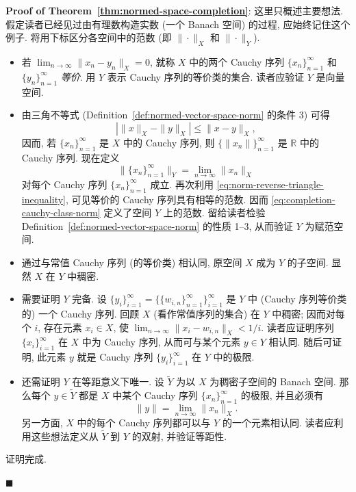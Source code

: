 \begingroup
\renewenvironment{Proof}{\vspace{0.1cm}\par}
{\par\hfill$\blacksquare$\par\vspace{0.1cm}}
\begin{Proof}
\textbf{Proof of Theorem~\ref{thm:normed-space-completion}}: 这里只概述主要想法. 假定读者已经见过由有理数构造实数 (一个 Banach 空间) 的过程, 应始终记住这个例子. 将用下标区分各空间中的范数 (即 $\|\cdot\|_X$ 和 $\|\cdot\|_Y$).\begin{itemize}\item 若 $\lim_{n\to\infty}\|x_n-y_n\|_X=0$, 就称 $X$ 中的两个 Cauchy 序列 $\{x_n\}_{n=1}^\infty$ 和 $\{y_n\}_{n=1}^\infty$ \emph{等价}. 用 $Y$ 表示 Cauchy 序列的等价类的集合. 读者应验证 $Y$ 是向量空间.
\item 由三角不等式 (Definition~\ref{def:normed-vector-space-norm} 的条件 3) 可得
\begin{equation}\label{eq:norm-reverse-triangle-inequality}
|\|x\|_X-\|y\|_X|\leq\|x-y\|_X,
\end{equation}
因而, 若 $\{x_n\}_{n=1}^\infty$ 是 $X$ 中的 Cauchy 序列, 则 $\{\|x_n\|\}_{n=1}^\infty$ 是 $\mathbb{R}$ 中的 Cauchy 序列. 现在定义
\begin{equation}\label{eq:completion-cauchy-class-norm}
\|\{x_n\}_{n=1}^\infty\|_Y=\lim_{n\to\infty}\|x_n\|_X
\end{equation}
对每个 Cauchy 序列 $\{x_n\}_{n=1}^\infty$ 成立. 再次利用 \eqref{eq:norm-reverse-triangle-inequality}, 可见等价的 Cauchy 序列具有相等的范数. 因而 \eqref{eq:completion-cauchy-class-norm} 定义了空间 $Y$ 上的范数. 留给读者检验 Definition~\ref{def:normed-vector-space-norm} 的性质 1--3, 从而验证 $Y$ 为赋范空间.
\item 通过与常值 Cauchy 序列 (的等价类) 相认同, 原空间 $X$ 成为 $Y$ 的子空间. 显然 $X$ 在 $Y$ 中稠密.
\item 需要证明 $Y$ 完备. 设 $\{y_i\}_{i=1}^\infty=\{\{w_{i,n}\}_{n=1}^\infty\}_{i=1}^\infty$ 是 $Y$ 中 (Cauchy 序列等价类的) 一个 Cauchy 序列. 回顾 $X$ (看作常值序列的集合) 在 $Y$ 中稠密; 因而对每个 $i$, 存在元素 $x_i\in X$, 使 $\lim_{n\to\infty}\|x_i-w_{i,n}\|_X<1/i$. 读者应证明序列 $\{x_i\}_{i=1}^\infty$ 在 $X$ 中为 Cauchy 序列, 从而可与某个元素 $y\in Y$ 相认同. 随后可证明, 此元素 $y$ 就是 Cauchy 序列 $\{y_i\}_{i=1}^\infty$ 在 $Y$ 中的极限.
\item 还需证明 $Y$ 在等距意义下唯一. 设 $\widetilde Y$ 为以 $X$ 为稠密子空间的 Banach 空间. 那么每个 $y\in\widetilde Y$ 都是 $X$ 中某个 Cauchy 序列 $\{x_n\}_{n=1}^\infty$ 的极限, 并且必须有
\begin{equation}\label{eq:completion-isometry-unique-norm}
\|y\|=\lim_{n\to\infty}\|x_n\|_X.
\end{equation}
另一方面, $X$ 中的每个 Cauchy 序列都可以与 $Y$ 的一个元素相认同. 读者应利用这些想法定义从 $\widetilde Y$ 到 $Y$ 的双射, 并验证等距性.\end{itemize}
证明完成.
\end{Proof}
\endgroup

